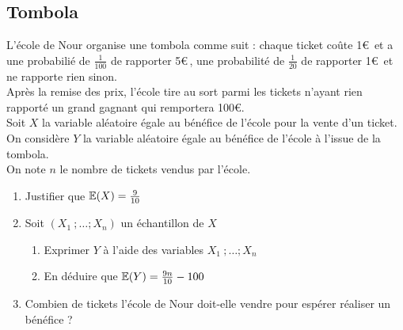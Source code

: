 \documentclass[oneside,12pt]{book}          %
\begin{document}
\subsection{Tombola}
L'école de Nour organise une tombola comme suit : chaque ticket coûte 1\euro\, et a une probabilié de $\frac{1}{100}$ de rapporter 5\euro\,, une probabilité de $\frac{1}{20}$ de rapporter 1\euro\, et ne rapporte rien sinon.\\
Après la remise des prix, l'école tire au sort parmi les tickets n'ayant rien rapporté un grand gagnant qui remportera 100\euro.\\
Soit $X$ la variable aléatoire égale au bénéfice de l'école pour la vente d'un ticket.\\
On considère $Y$ la variable aléatoire égale au bénéfice de l'école à l'issue de la tombola.\\
On note $n$ le nombre de tickets vendus par l'école.
\begin{enumerate}
    \item Justifier que ${\mathbb E}(X)=\frac{9}{10}$
    \item Soit $(X_1~;\ldots;X_n)$ un échantillon de $X$
    \begin{enumerate}
        \item Exprimer $Y$ à l'aide des variables $X_1 ~;\ldots;X_n$
        \item En déduire que ${\mathbb E}(Y)=\frac{9n}{10}-100$
    \end{enumerate}
    \item Combien de tickets l'école de Nour doit-elle vendre pour espérer réaliser un bénéfice ?
\end{enumerate}
\end{document}
